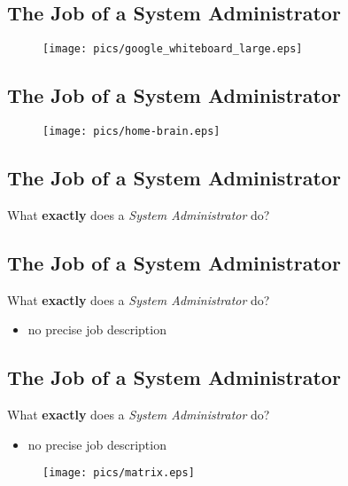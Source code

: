 \documentclass[xga]{xdvislides}
\begin{document}
\subsection{The Job of a System Administrator}
\vspace*{\fill}
\begin{figure}[hb]
	\begin{center}
		\texttt{[image: pics/google\_whiteboard\_large.eps]} \\
	\end{center}
\end{figure}
\vspace*{\fill}

\subsection{The Job of a System Administrator}
\vspace*{\fill}
\begin{figure}[hb]
	\begin{center}
		\texttt{[image: pics/home-brain.eps]} \\
	\end{center}
\end{figure}
\vspace*{\fill}

\subsection{The Job of a System Administrator}
What {\bf exactly} does a {\em System Administrator} do?

\subsection{The Job of a System Administrator}
What {\bf exactly} does a {\em System Administrator} do?
\begin{itemize}
	\item no precise job description
\end{itemize}

\subsection{The Job of a System Administrator}
What {\bf exactly} does a {\em System Administrator} do?
\begin{itemize}
	\item no precise job description
\end{itemize}
\begin{figure}[hb]
	\begin{center}
		\texttt{[image: pics/matrix.eps]} \\
	\end{center}
\end{figure}
\end{document}
